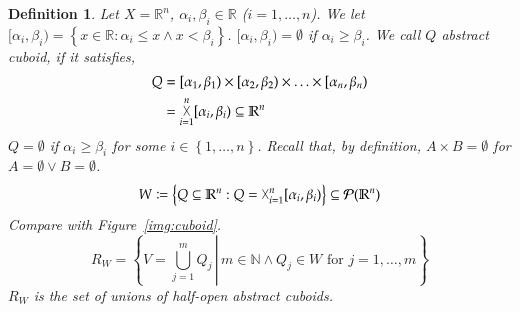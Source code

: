 \documentclass{article}
\newtheorem{definition}{Definition}  \numberwithin{definition}{section}
\newcommand{\set}[1]{\left\{#1\right\}}
\newcommand{\setdef}[2]{\left\{\left.#1\,\right|\,#2\right\}}
\DeclareMathOperator*{\bigtimes}{\vartimes}
\begin{document}
\begin{definition}
  Let $X = \mathbb R^n$, $\alpha_i, \beta_i \in \mathbb R$ ($i=1,\ldots,n$).
  We let $[\alpha_i, \beta_i) = \set{x \in \mathbb R: \alpha_i \leq x \land x < \beta_i}$.
  $[\alpha_i, \beta_i) = \emptyset$ if $\alpha_i \geq \beta_i$.
  We call $Q$ \emph{abstract cuboid}, if it satisfies,
  \begin{align*}
    Q &= [\alpha_1, \beta_1) \times [\alpha_2, \beta_2) \times \ldots \times [\alpha_n, \beta_n) \\
      &= \bigtimes_{i=1}^n [\alpha_i, \beta_i) \subseteq \mathbb R^n  %
  \end{align*}
  $Q = \emptyset$ if $\alpha_i \geq \beta_i$ for some $i \in \set{1,\ldots,n}$.
  Recall that, by definition, $A \times B = \emptyset$ for $A = \emptyset \lor B = \emptyset$.
  \[ W \coloneqq \set{Q \subseteq \mathbb R^n: Q = {\bigtimes}_{i=1}^n [\alpha_i, \beta_i)} \subseteq \mathcal P(\mathbb R^n) \]
  Compare with Figure~\ref{img:cuboid}.
  \[ R_W = \setdef{V = \bigcup_{j=1}^m Q_j}{m \in \mathbb N \land Q_j \in W \text{ for } j = 1,\ldots,m} \]
  $R_W$ is the set of unions of half-open abstract cuboids.
\end{definition}
\end{document}
